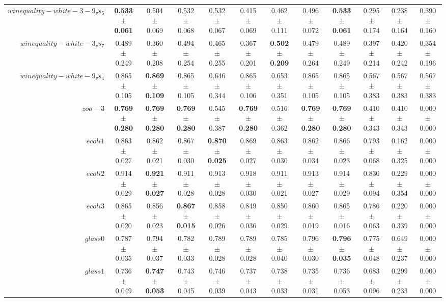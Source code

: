\begin{table}[!ht]
{\begin{tabular}{r c c c c c c c c c c c}
$winequality-white-3-9_vs_5$ & \textbf{0.533 $\pm$ 0.061} & 0.504 $\pm$ 0.069 & 0.532 $\pm$ 0.068 & 0.532 $\pm$ 0.067 & 0.415 $\pm$ 0.069 & 0.462 $\pm$ 0.111 & 0.496 $\pm$ 0.072 & \textbf{0.533 $\pm$ 0.061} & 0.295 $\pm$ 0.174 & 0.238 $\pm$ 0.164 & 0.390 $\pm$ 0.160 \\
$winequality-white-3_vs_7$ & 0.489 $\pm$ 0.249 & 0.360 $\pm$ 0.208 & 0.494 $\pm$ 0.254 & 0.465 $\pm$ 0.255 & 0.367 $\pm$ 0.201 & \textbf{0.502 $\pm$ 0.209} & 0.479 $\pm$ 0.264 & 0.489 $\pm$ 0.249 & 0.397 $\pm$ 0.214 & 0.420 $\pm$ 0.242 & 0.354 $\pm$ 0.196 \\
$winequality-white-9_vs_4$ & 0.865 $\pm$ 0.105 & \textbf{0.869 $\pm$ 0.109} & 0.865 $\pm$ 0.105 & 0.646 $\pm$ 0.344 & 0.865 $\pm$ 0.106 & 0.653 $\pm$ 0.351 & 0.865 $\pm$ 0.105 & 0.865 $\pm$ 0.105 & 0.567 $\pm$ 0.383 & 0.567 $\pm$ 0.383 & 0.567 $\pm$ 0.383 \\
$zoo-3$ & \textbf{0.769 $\pm$ 0.280} & \textbf{0.769 $\pm$ 0.280} & \textbf{0.769 $\pm$ 0.280} & 0.545 $\pm$ 0.387 & \textbf{0.769 $\pm$ 0.280} & 0.516 $\pm$ 0.362 & \textbf{0.769 $\pm$ 0.280} & \textbf{0.769 $\pm$ 0.280} & 0.410 $\pm$ 0.343 & 0.410 $\pm$ 0.343 & 0.000 $\pm$ 0.000 \\
$ecoli1$ & 0.863 $\pm$ 0.027 & 0.862 $\pm$ 0.021 & 0.867 $\pm$ 0.030 & \textbf{0.870 $\pm$ 0.025} & 0.869 $\pm$ 0.027 & 0.863 $\pm$ 0.030 & 0.862 $\pm$ 0.034 & 0.866 $\pm$ 0.023 & 0.793 $\pm$ 0.068 & 0.162 $\pm$ 0.325 & 0.000 $\pm$ 0.000 \\
$ecoli2$ & 0.914 $\pm$ 0.029 & \textbf{0.921 $\pm$ 0.027} & 0.911 $\pm$ 0.028 & 0.913 $\pm$ 0.028 & 0.918 $\pm$ 0.030 & 0.911 $\pm$ 0.021 & 0.913 $\pm$ 0.027 & 0.914 $\pm$ 0.029 & 0.830 $\pm$ 0.094 & 0.229 $\pm$ 0.354 & 0.000 $\pm$ 0.000 \\
$ecoli3$ & 0.865 $\pm$ 0.020 & 0.856 $\pm$ 0.023 & \textbf{0.867 $\pm$ 0.015} & 0.858 $\pm$ 0.026 & 0.849 $\pm$ 0.036 & 0.850 $\pm$ 0.029 & 0.860 $\pm$ 0.019 & 0.865 $\pm$ 0.016 & 0.786 $\pm$ 0.063 & 0.220 $\pm$ 0.339 & 0.000 $\pm$ 0.000 \\
$glass0$ & 0.787 $\pm$ 0.035 & 0.794 $\pm$ 0.037 & 0.782 $\pm$ 0.033 & 0.789 $\pm$ 0.028 & 0.789 $\pm$ 0.028 & 0.785 $\pm$ 0.040 & 0.796 $\pm$ 0.030 & \textbf{0.796 $\pm$ 0.035} & 0.775 $\pm$ 0.048 & 0.649 $\pm$ 0.237 & 0.000 $\pm$ 0.000 \\
$glass1$ & 0.736 $\pm$ 0.049 & \textbf{0.747 $\pm$ 0.053} & 0.743 $\pm$ 0.045 & 0.746 $\pm$ 0.039 & 0.737 $\pm$ 0.043 & 0.738 $\pm$ 0.033 & 0.735 $\pm$ 0.031 & 0.736 $\pm$ 0.053 & 0.683 $\pm$ 0.096 & 0.299 $\pm$ 0.233 & 0.000 $\pm$ 0.000 \\

\end{tabular}}
\end{table}
